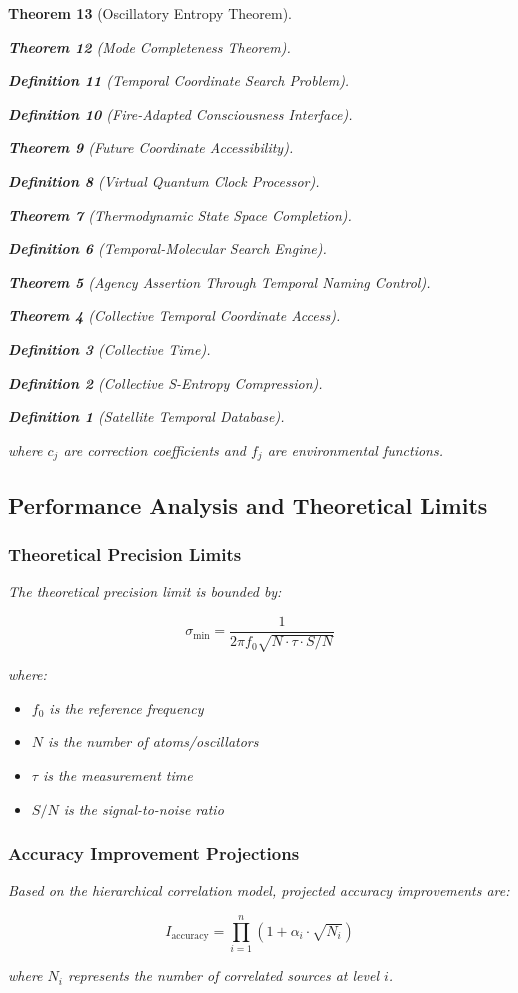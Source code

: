 \documentclass[12pt,a4paper]{article}
\newtheorem{theorem}{Theorem}[section]
\newtheorem{definition}[theorem]{Definition}
\begin{document}
\begin{theorem}[Oscillatory Entropy Theorem]
\begin{theorem}[Mode Completeness Theorem]
\begin{enumerate}
\begin{definition}[Temporal Coordinate Search Problem]
\begin{algorithm}
\begin{definition}[Fire-Adapted Consciousness Interface]
\begin{theorem}[Future Coordinate Accessibility]
\begin{definition}[Virtual Quantum Clock Processor]
\begin{itemize}
\begin{itemize}
\begin{theorem}[Thermodynamic State Space Completion]
\begin{definition}[Temporal-Molecular Search Engine]
\begin{theorem}[Agency Assertion Through Temporal Naming Control]
\begin{remark}
\begin{theorem}[Collective Temporal Coordinate Access]
\begin{definition}[Collective Time]
\begin{definition}[Collective S-Entropy Compression]
\begin{definition}[Satellite Temporal Database]
\begin{algorithm}
\begin{table}[h]
{{where $c_j$ are correction coefficients and $f_j$ are environmental functions.

\subsection{Performance Analysis and Theoretical Limits}

\subsubsection{Theoretical Precision Limits}

The theoretical precision limit is bounded by:

\begin{equation}
\sigma_{\text{min}} = \frac{1}{2\pi f_0 \sqrt{N \cdot \tau \cdot S/N}}
\end{equation}

where:
\begin{itemize}
\item $f_0$ is the reference frequency
\item $N$ is the number of atoms/oscillators
\item $\tau$ is the measurement time
\item $S/N$ is the signal-to-noise ratio
\end{itemize}

\subsubsection{Accuracy Improvement Projections}

Based on the hierarchical correlation model, projected accuracy improvements are:

\begin{equation}
I_{\text{accuracy}} = \prod_{i=1}^{n} (1 + \alpha_i \cdot \sqrt{N_i})
\end{equation}

where $N_i$ represents the number of correlated sources at level $i$.

}}
\end{table}
\end{algorithm}
\end{definition}
\end{definition}
\end{definition}
\end{theorem}
\end{remark}
\end{theorem}
\end{definition}
\end{theorem}
\end{itemize}
\end{itemize}
\end{definition}
\end{theorem}
\end{definition}
\end{algorithm}
\end{definition}
\end{enumerate}
\end{theorem}
\end{theorem}
\end{document}
